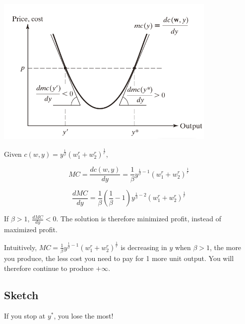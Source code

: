 \documentclass{article}
\begin{document}
\begin{mdframed}[backgroundcolor=blue!20,linecolor=white]
\vspace{2mm}
{\centering
\includegraphics[width=0.8\textwidth]{5.mc}
\label{fig:mc}}
\vspace{2mm}

\end{mdframed}

Given $c(w,y) = y^{\frac{1}{\beta}}{(w_1^r + w_2^r)^{\frac{1}{r}}} $,

$$MC=\frac{dc(w,y)}{dy}= \frac{1}{\beta}  y^{\frac{1}{\beta} - 1}{(w_1^r + w_2^r)^{\frac{1}{r}}}$$

$$\frac{d MC}{dy} = \frac{1}{\beta}(\frac{1}{\beta} - 1)  y^{\frac{1}{\beta} - 2}{(w_1^r + w_2^r)^{\frac{1}{r}}}$$


If $\beta >1$, $\frac{d MC}{dy} < 0$. The solution is therefore minimized profit, instead of maximized profit.

\begin{mdframed}[backgroundcolor=blue!20,linecolor=white]
Intuitively, $MC=\frac{1}{\beta}  y^{\frac{1}{\beta} - 1}{(w_1^r + w_2^r)^{\frac{1}{r}}}$ is decreasing in $y$ when $\beta > 1$, the more you produce, the less cost you need to pay for 1 more unit output. You will therefore continue to produce $+\infty$.
\end{mdframed}

\subsection{Sketch}

\begin{center}
\label{fig:mc}
\end{center}
\vspace{2mm}

If you stop at $y^*$, you lose the most!
\end{document}
